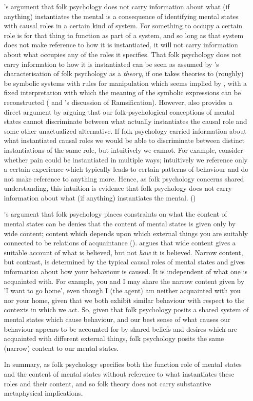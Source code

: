 \documentclass[10pt]{article}
\begin{document}
\citeauthor{Lewis:1999ab}'s argument that folk psychology does not carry information about what (if anything) instantiates the mental is a consequence of identifying mental states with causal roles in a certain kind of system.
For something to occupy a certain role is for that thing to function as part of a system, and so long as that system does not make reference to how it is instantiated, it will not carry information about what occupies any of the roles it specifies.
That folk psychology does not carry information to how it is instantiated can be seen as assumed by \citeauthor{Lewis:1999ab}'s characterisation of folk psychology as a \emph{theory}, if one takes theories to (roughly) be symbolic systems with rules for manipulation which seems implied by \citeauthor{Lewis:1999ab}, with a fixed interpretation with which the meaning of the symbolic expressions can be reconstructed (\citeyear[cf.][298]{Lewis:1999ab} and \citeauthor{Lewis:1999ab}'s discussion of Ramsification).
However, \citeauthor{Lewis:1999ab} also provides a direct argument by arguing that our folk-psychological conceptions of mental states cannot discriminate between what actually instantiates the causal role and some other unactualized alternative.
If folk psychology carried information about what instantiated causal roles we would be able to discriminate between distinct instantiations of the same role, but intuitively we cannot.
For example, consider whether pain could be instantiated in multiple ways; intuitively we reference only a certain experience which typically leads to certain patterns of behaviour and do not make reference to anything more.
Hence, as folk psychology concerns shared understanding, this intuition is evidence that folk psychology does not carry information about what (if anything) instantiates the mental.
(\citeyear[304]{Lewis:1999ab})

\citeauthor{Lewis:1999ab}'s argument that folk psychology places constraints on what the content of mental states can be denies that the content of mental states is given only by wide content; content which depends upon which external things you are suitably connected to be relations of acquaintance (\citeyear[312]{Lewis:1999ab}).
\citeauthor{Lewis:1999ab} argues that wide content gives a suitable account of what is believed, but not \emph{how} it is believed.
Narrow content, but contrast, is determined by the typical causal roles of mental states and gives information about how your behaviour is caused.
It is independent of what one is acquainted with.
For example, you and I may share the narrow content given by 'I want to go home', even though I (the agent) am neither acquainted with you nor your home, given that we both exhibit similar behaviour with respect to the contexts in which we act.
So, given that folk psychology posits a shared system of mental states which cause behaviour, and our best sense of what causes our behaviour appears to be accounted for by shared beliefs and desires which are acquainted with different external things, folk psychology posits the same (narrow) content to our mental states.

In summary, as folk psychology specifies both the function role of mental states and the content of mental states without reference to what instantiates these roles and their content, and so folk theory does not carry substantive metaphysical implications.

\vfill

\printbibliography
\end{document}
